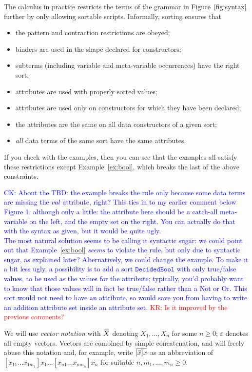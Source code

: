 \documentclass[letterpaper,11pt]{article}
\newcommand{\CK}[1]{\textcolor{blue}{CK: #1}}
\newcommand{\KR}[1]{\textcolor{red}{KR: #1}}
\begin{document}
The \hax calculus in practice restricts the terms of the grammar in Figure~\ref{fig:syntax} further
by only allowing sortable scripts. Informally, sorting ensures that
\begin{itemize}
\item the pattern and contraction restrictions are obeyed;
\item binders are used in the shape declared for constructors;
\item subterms (including variable and meta-variable occurrences) have the right sort;
\item attributes are used with properly sorted values;
\item attributes are used only on constructors for which they have been declared;
\item the attributes are the same on all data constructors of a given sort;
\item \emph{all} data terms of the same sort have the same attributes.
\end{itemize}
If you check with the examples, then you can see that the examples all satisfy these restrictions
except Example~\ref{ex:bool}, which breaks the last of the above constraints. 

\CK{About the TBD: the example breaks the rule only because some data terms are
missing the $\mathit{val}$ attribute, right?  This ties in to my earlier
comment below Figure 1, although only a little: the attribute here should be a
catch-all meta-variable on the left, and the empty set on the right.  You can
actually do that with the syntax as given, but it would be quite ugly. \\
The most natural solution seems to be calling it syntactic sugar: we could
point out that Example~\ref{ex:bool} \emph{seems} to violate the rule, but
only due to syntactic sugar, as explained later?  Alternatively, we could
change the example.  To make it a bit less ugly, a possibility is to add a
sort $\mathtt{DecidedBool}$ with only true/false values, to be used as the
values for the attribute; typically, you'd probably want to know that those
values will in fact be true/false rather than a Not or Or.  This sort would
not need to have an attribute, so would save you from having to write an
addition attribute set inside an attribute set.}
\KR{Is it improved by the previous comments?}

\begin{notation}[vectors]
  We will use \emph{vector notation} with $\ov{X}$ denoting $X_1,…,X_n$ for some $n≥0$; $ε$ denotes
  all empty vectors. Vectors are combined by simple concatenation, and will freely abuse this
  notation and, for example, write $\ov{[\ov{x}]x}$ as an abbreviation of
  $[x_{11}…x_{1m_1}]x_1…[x_{n1}…x_{nm_n}]x_n$ for suitable $n,m_1,…,m_n ≥ 0$.
\end{notation}
\end{document}
